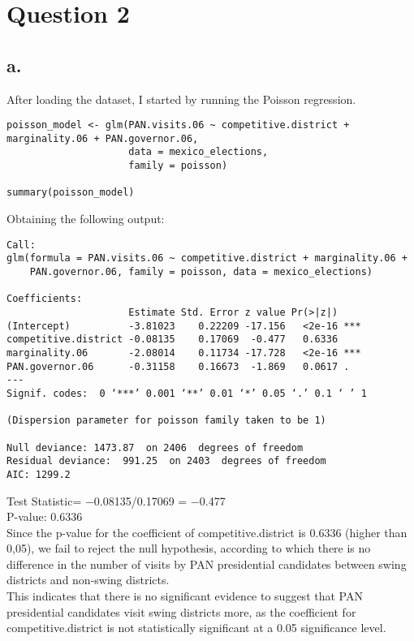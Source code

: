 \documentclass[oneside]{article}
\begin{document}
\section*{Question 2}
\subsection*{a.}
After loading the dataset, I started by running the Poisson regression.
\begin{verbatim}
poisson_model <- glm(PAN.visits.06 ~ competitive.district + marginality.06 + PAN.governor.06, 
                     data = mexico_elections, 
                     family = poisson)

summary(poisson_model)
\end{verbatim}
Obtaining the following output:
\begin{verbatim}
Call:
glm(formula = PAN.visits.06 ~ competitive.district + marginality.06 + 
    PAN.governor.06, family = poisson, data = mexico_elections)

Coefficients:
                     Estimate Std. Error z value Pr(>|z|)    
(Intercept)          -3.81023    0.22209 -17.156   <2e-16 ***
competitive.district -0.08135    0.17069  -0.477   0.6336    
marginality.06       -2.08014    0.11734 -17.728   <2e-16 ***
PAN.governor.06      -0.31158    0.16673  -1.869   0.0617 .  
---
Signif. codes:  0 ‘***’ 0.001 ‘**’ 0.01 ‘*’ 0.05 ‘.’ 0.1 ‘ ’ 1

(Dispersion parameter for poisson family taken to be 1)

Null deviance: 1473.87  on 2406  degrees of freedom
Residual deviance:  991.25  on 2403  degrees of freedom
AIC: 1299.2
\end{verbatim}
Test Statistic= −0.08135/0.17069 = −0.477
\\
P-value: 0.6336
\\
Since the p-value for the coefficient of competitive.district is 0.6336 (higher than 0,05), we fail to reject the null hypothesis, according to which there is no difference in the number of visits by PAN presidential candidates between swing districts and non-swing districts.
\\
This indicates that there is no significant evidence to suggest that PAN presidential candidates visit swing districts more, as the coefficient for competitive.district is not statistically significant at a 0.05 significance level.
\end{document}
